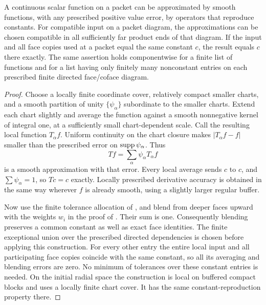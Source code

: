 \begin{lemma}\label{regular:constant-preservation}
A continuous scalar function on a packet can be approximated by smooth
functions, with any prescribed positive value error, by operators that
reproduce constants.  For compatible input on a packet diagram, the
approximations can be chosen compatible in all sufficiently far product
ends of that diagram.  If the input and all face copies
used at a packet equal the same constant $c$, the result equals $c$
there exactly.  The same assertion holds componentwise for a finite list
of functions and for a list having only finitely many nonconstant entries
on each prescribed finite directed face/coface diagram.
\end{lemma}

\begin{proof}
Choose a locally finite coordinate cover, relatively compact smaller
charts, and a smooth partition of unity $\{\psi_\alpha\}$ subordinate
to the smaller charts.  Extend each chart slightly and average the
function against a smooth nonnegative kernel of integral one, at a
sufficiently small chart-dependent scale.  Call the resulting local
function $T_\alpha f$.  Uniform continuity on the chart closure makes
$|T_\alpha f-f|$ smaller than the prescribed error on
$\operatorname{supp}\psi_\alpha$.  Thus
\[
                    Tf=\sum_\alpha\psi_\alpha T_\alpha f
\]
is a smooth approximation with that error.  Every local average sends
$c$ to $c$, and $\sum\psi_\alpha=1$, so $Tc=c$ exactly.  Locally
prescribed derivative accuracy is obtained in the same way wherever
$f$ is already smooth, using a slightly larger regular buffer.

Now use the finite tolerance allocation of
, and blend from deeper faces upward with
the weights $w_i$ in the proof of .  Their sum
is one.  Consequently blending preserves a common constant as well as
exact face identities.  The finite exceptional union over the prescribed
directed dependencies is chosen before applying this construction.
For every other entry the entire local input and all participating face
copies coincide with the same constant, so all its averaging and
blending errors are zero.  No minimum of tolerances over these constant
entries is needed.  On the initial radial space the construction is
local on buffered compact blocks and uses a locally finite chart cover.
It has the same constant-reproduction property there.
\end{proof}

